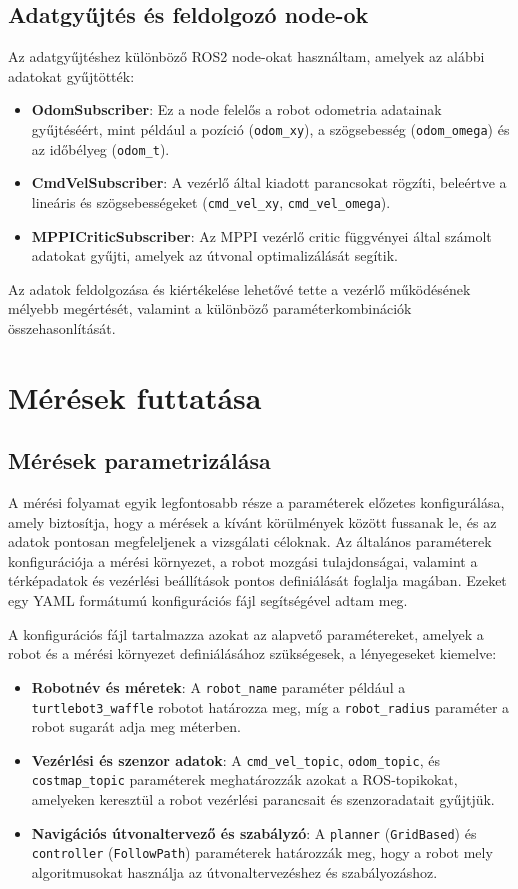 \subsection{Adatgyűjtés és feldolgozó node-ok}
Az adatgyűjtéshez különböző ROS2 node-okat használtam, amelyek az alábbi adatokat gyűjtötték:
\begin{itemize}
    \item \textbf{OdomSubscriber}: Ez a node felelős a robot odometria adatainak gyűjtéséért, mint például a pozíció (\texttt{odom\_xy}), a szögsebesség (\texttt{odom\_omega}) és az időbélyeg (\texttt{odom\_t}).
    \item \textbf{CmdVelSubscriber}: A vezérlő által kiadott parancsokat rögzíti, beleértve a lineáris és szögsebességeket (\texttt{cmd\_vel\_xy}, \texttt{cmd\_vel\_omega}).
    \item \textbf{MPPICriticSubscriber}: Az MPPI vezérlő critic függvényei által számolt adatokat gyűjti, amelyek az útvonal optimalizálását segítik.
\end{itemize}

Az adatok feldolgozása és kiértékelése lehetővé tette a vezérlő működésének mélyebb megértését, valamint a különböző paraméterkombinációk összehasonlítását.

\section{Mérések futtatása}
\subsection{Mérések parametrizálása}
A mérési folyamat egyik legfontosabb része a paraméterek előzetes konfigurálása, amely biztosítja, hogy a mérések a kívánt körülmények között fussanak le, és az adatok pontosan megfeleljenek a vizsgálati céloknak. Az általános paraméterek konfigurációja a mérési környezet, a robot mozgási tulajdonságai, valamint a térképadatok és vezérlési beállítások pontos definiálását foglalja magában. Ezeket egy YAML formátumú konfigurációs fájl segítségével adtam meg.

A konfigurációs fájl tartalmazza azokat az alapvető paramétereket, amelyek a robot és a mérési környezet definiálásához szükségesek, a lényegeseket kiemelve:
\begin{itemize}
    \item \textbf{Robotnév és méretek}: A \texttt{robot\_name} paraméter például a \texttt{turtlebot3\_waffle} robotot határozza meg, míg a \texttt{robot\_radius} paraméter a robot sugarát adja meg méterben.
    \item \textbf{Vezérlési és szenzor adatok}: A \texttt{cmd\_vel\_topic}, \texttt{odom\_topic}, és \texttt{costmap\_topic} paraméterek meghatározzák azokat a ROS-topikokat, amelyeken keresztül a robot vezérlési parancsait és szenzoradatait gyűjtjük.
    \item \textbf{Navigációs útvonaltervező és szabályzó}: A \texttt{planner} (\texttt{GridBased}) és \texttt{controller} (\texttt{FollowPath}) paraméterek határozzák meg, hogy a robot mely algoritmusokat használja az útvonaltervezéshez és szabályozáshoz.
\end{itemize}

